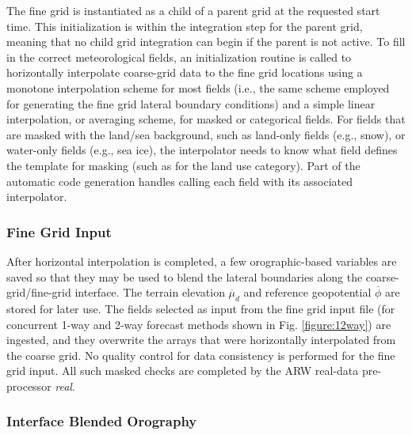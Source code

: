 The fine grid is instantiated as a child 
of a parent grid at the requested start time.
This initialization is within the integration step for the parent 
grid, meaning that no child grid integration can begin if the parent is not active.  
To fill in the correct meteorological 
fields, an initialization routine is called to horizontally interpolate
coarse-grid data to the fine grid locations using a monotone
interpolation scheme \citep[described in][]{smolargrell92} for most fields 
(i.e., the same scheme employed for generating the fine grid lateral
boundary conditions)
and a simple linear interpolation, or averaging scheme, for masked or
categorical fields.
For fields that are masked with the land/sea background, such 
as land-only fields (e.g., snow), or water-only fields (e.g., sea ice), the 
interpolator needs to know what field defines the template for masking
(such as for the land use category).  Part of the automatic code generation handles
calling each field with its associated interpolator.

\subsubsection{Fine Grid Input}

After horizontal interpolation is completed, a few orographic-based variables 
are saved so that they may be used to blend the lateral boundaries
along the coarse-grid/fine-grid interface.  
The terrain elevation 
$\overline {\mu}_d$
and reference geopotential $\overline{\phi}$ are stored for later use.
The fields selected as input from the fine grid input file (for 
concurrent 1-way and 2-way forecast methods shown in Fig. \ref{figure:12way}) are ingested, and
they overwrite the arrays that were horizontally interpolated from the
coarse grid.  No quality control for data consistency is performed
for the fine grid input.  All such masked checks are
completed by the ARW real-data pre-processor {\it real}.

\subsubsection{Interface Blended Orography}

